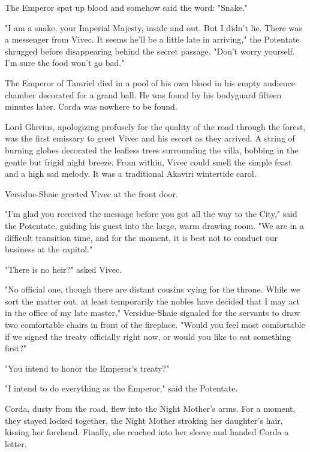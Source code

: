 The Emperor spat up blood and somehow said the word: "Snake."

"I am a snake, your Imperial Majesty, inside and out. But I didn't lie. There was a messenger from Vivec. It seems he'll be a little late in arriving," the Potentate shrugged before disappearing behind the secret passage. "Don't worry yourself. I'm sure the food won't go bad."

The Emperor of Tamriel died in a pool of his own blood in his empty audience chamber decorated for a grand ball. He was found by his bodyguard fifteen minutes later. Corda was nowhere to be found.

Lord Glavius, apologizing profusely for the quality of the road through the forest, was the first emissary to greet Vivec and his escort as they arrived. A string of burning globes decorated the leafless trees surrounding the villa, bobbing in the gentle but frigid night breeze. From within, Vivec could smell the simple feast and a high sad melody. It was a traditional Akaviri wintertide carol.

Versidue-Shaie greeted Vivec at the front door.

"I'm glad you received the message before you got all the way to the City," said the Potentate, guiding his guest into the large, warm drawing room. "We are in a difficult transition time, and for the moment, it is best not to conduct our business at the capitol."

"There is no heir?" asked Vivec.

"No official one, though there are distant cousins vying for the throne. While we sort the matter out, at least temporarily the nobles have decided that I may act in the office of my late master," Versidue-Shaie signaled for the servants to draw two comfortable chairs in front of the fireplace. "Would you feel most comfortable if we signed the treaty officially right now, or would you like to eat something first?"

"You intend to honor the Emperor's treaty?"

"I intend to do everything as the Emperor," said the Potentate.

Corda, dusty from the road, flew into the Night Mother's arms. For a moment, they stayed locked together, the Night Mother stroking her daughter's hair, kissing her forehead. Finally, she reached into her sleeve and handed Corda a letter.

